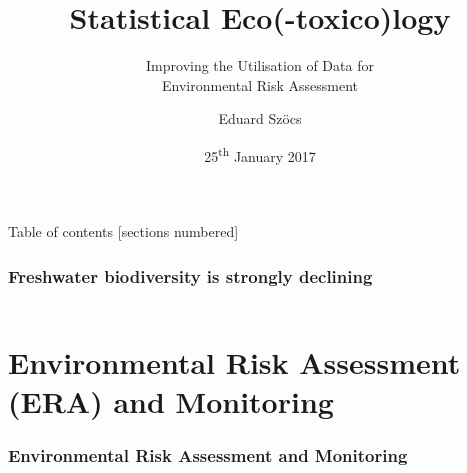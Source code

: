 \documentclass[10pt
	]{beamer}
\title{Statistical Eco(-toxico)logy}
\subtitle{Improving the Utilisation of Data for\\Environmental Risk Assessment}
\date{25\textsuperscript{th} January 2017}
\author{Eduard Sz\"{o}cs}
\begin{document}
\maketitle

\begin{frame}{Table of contents}
  [sections numbered]
  \tableofcontents[hideallsubsections]
\end{frame}


{%
\begin{frame}[t]
\frametitle{Freshwater biodiversity is strongly declining}
	\begin{columns}[T]
	\end{columns}
\end{frame}
}



\section[Environmental Risk Assessment and Environmental Monitoring
]{Environmental Risk Assessment (ERA) and Monitoring}

\begin{frame}
\frametitle{Environmental Risk Assessment and Monitoring}
 \resizebox{11.5cm}{!}{%
				
				}
\end{frame}



\end{document}
